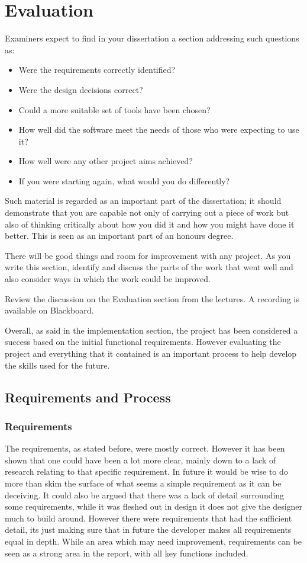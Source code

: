 \chapter{Evaluation}

Examiners expect to find in your dissertation a section addressing such questions as:

\begin{itemize}
   \item Were the requirements correctly identified? 
   \item Were the design decisions correct?
   \item Could a more suitable set of tools have been chosen?
   \item How well did the software meet the needs of those who were expecting to use it?
   \item How well were any other project aims achieved?
   \item If you were starting again, what would you do differently?
\end{itemize}

Such material is regarded as an important part of the dissertation; it should demonstrate that you are capable not only of carrying out a piece of work but also of thinking critically about how you did it and how you might have done it better. This is seen as an important part of an honours degree. 

There will be good things and room for improvement with any project. As you write this section, identify and discuss the parts of the work that went well and also consider ways in which the work could be improved. 

Review the discussion on the Evaluation section from the lectures. A recording is available on Blackboard.

Overall, as said in the implementation section, the project has been considered a success based on the initial functional requirements. However evaluating the project and everything that it contained is an important process to help develop the skills used for the future.

\section{Requirements and Process}
\subsection{Requirements}
The requirements, as stated before, were mostly correct. However it has been shown that one could have been a lot more clear, mainly down to a lack of research relating to that specific requirement. In future it would be wise to do more than skim the surface of what seems a simple requirement as it can be deceiving.  It could also be argued that there was a lack of detail surrounding some requirements, while it was fleshed out in design it does not give the designer much to build around. However there were requirements that had the sufficient detail, its just making sure that in future the developer makes all requirements equal in depth. While an area which may need improvement, requirements can be seen as a strong area in the report, with all key functions included.

